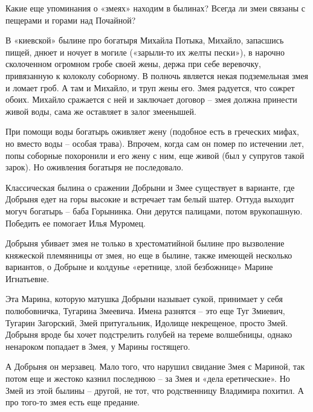 Какие еще упоминания о «змеях» находим в былинах? Всегда ли змеи связаны с пещерами и горами над Почайной?

В «киевской» былине про богатыря Михайла Потыка, Михайло, запасшись пищей, днюет и ночует в могиле («зарыли-то их желты пески»), в нарочно сколоченном огромном гробе своей жены, держа при себе веревочку, привязанную к колоколу соборному. В полночь является некая подземельная змея и ломает гроб. А там и Михайло, и труп жены его. Змея радуется, что сожрет обоих. Михайло сражается с ней и заключает договор – змея должна принести живой воды, сама же оставляет в залог змеенышей. 

При помощи воды богатырь оживляет жену (подобное есть в греческих мифах, но вместо воды – особая трава). Впрочем, когда сам он помер по истечении лет, попы соборные похоронили и его жену с ним, еще живой (был у супругов такой зарок). Но оживления богатыря не последовало. 

Классическая былина о сражении Добрыни и Змее существует в варианте, где Добрыня едет на горы высокие и встречает там белый шатер. Оттуда выходит могуч богатырь – баба Горынинка. Они дерутся палицами, потом врукопашную. Победить ее помогает Илья Муромец.

Добрыня убивает змея не только в хрестоматийной былине про вызволение княжеской племянницы от змея, но еще в былине, также имеющей несколько вариантов, о Добрыне и колдунье «еретнице, злой безбожнице» Марине Игнатьевне. 

Эта Марина, которую матушка Добрыни называет сукой, принимает у себя полюбовничка, Тугарина Змеевича. Имена разнятся – это еще Туг Змиевич, Тугарин Загорский, Змей притугальник, Идолище некрещеное, просто Змей. Добрыня вроде бы хочет подстрелить голубей на тереме волшебницы, однако ненароком попадает в Змея, у Марины гостящего.

А Добрыня он мерзавец. Мало того, что нарушил свидание Змея с Мариной, так потом еще и жестоко казнил последнюю – за Змея и «дела еретические». Но Змей из этой былины – другой, не тот, что родственницу Владимира похитил. А про того-то змея есть еще предание.
